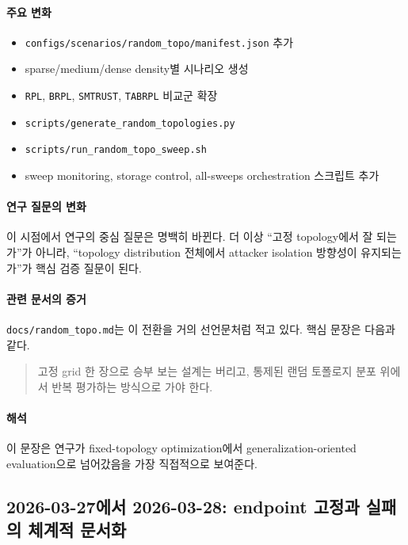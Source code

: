 \documentclass[12pt,a4paper]{article}
\begin{document}
\paragraph{주요 변화}
\begin{itemize}[leftmargin=1.5em]
\item \texttt{configs/scenarios/random\_topo/manifest.json} 추가
\item sparse/medium/dense density별 시나리오 생성
\item \texttt{RPL}, \texttt{BRPL}, \texttt{SMTRUST}, \texttt{TABRPL} 비교군 확장
\item \texttt{scripts/generate\_random\_topologies.py}
\item \texttt{scripts/run\_random\_topo\_sweep.sh}
\item sweep monitoring, storage control, all-sweeps orchestration 스크립트 추가
\end{itemize}

\paragraph{연구 질문의 변화}
이 시점에서 연구의 중심 질문은 명백히 바뀐다.
더 이상 ``고정 topology에서 잘 되는가''가 아니라,
``topology distribution 전체에서 attacker isolation 방향성이 유지되는가''가
핵심 검증 질문이 된다.

\paragraph{관련 문서의 증거}
\texttt{docs/random\_topo.md}는 이 전환을 거의 선언문처럼 적고 있다.
핵심 문장은 다음과 같다.

\begin{quote}
고정 grid 한 장으로 승부 보는 설계는 버리고,
통제된 랜덤 토폴로지 분포 위에서 반복 평가하는 방식으로 가야 한다.
\end{quote}

\paragraph{해석}
이 문장은 연구가 fixed-topology optimization에서 generalization-oriented evaluation으로
넘어갔음을 가장 직접적으로 보여준다.

\subsection{2026-03-27에서 2026-03-28: endpoint 고정과 실패의 체계적 문서화}
\end{document}
